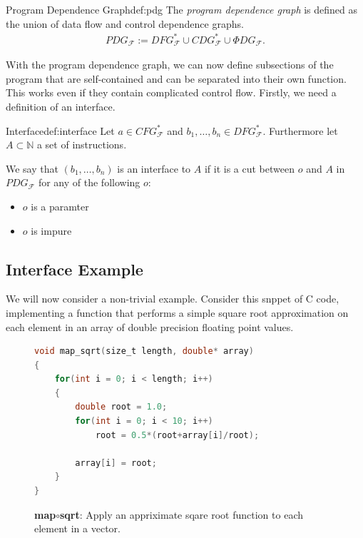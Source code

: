    \begin{definition}{Program Dependence Graph}{def:pdg}
        The {\em program dependence graph} is defined as the union of data flow
        and control dependence graphs.
        \begin{align*}
            PDG_\mathcal{F}:=DFG_\mathcal{F}^*\cup CDG_\mathcal{F}^*\cup\Phi DG_\mathcal{F}\text{.}
        \end{align*}
    \end{definition}

    With the program dependence graph, we can now define subsections of the
    program that are self-contained and can be separated into their own
    function.
    This works even if they contain complicated control flow.
    Firstly, we need a definition of an interface.

    \begin{definition}{Interface}{def:interface}
        Let $a\in CFG_\mathcal{F}^*$ and $b_1,\dots,b_n\in DFG_\mathcal{F}^*$.
        Furthermore let $A\subset\mathbb{N}$ a set of instructions.

        We say that $(b_1,\dots,b_n)$ is an interface to $A$ if it is a cut
        between $o$ and $A$ in $PDG_\mathcal{F}$ for any of the following $o$:
        \begin{itemize}
            \item $o$ is a paramter
            \item $o$ is impure
        \end{itemize}
    \end{definition}


\newpage
\subsection{Interface Example}

    We will now consider a non-trivial example.
    Consider this snppet of C code, implementing a function that performs a
    simple square root approximation on each element in an array of double
    precision floating point values.

\begin{figure}[ht]
\begin{lstlisting}[language=C]
void map_sqrt(size_t length, double* array)
{
    for(int i = 0; i < length; i++)
    {
        double root = 1.0;
        for(int i = 0; i < 10; i++)
            root = 0.5*(root+array[i]/root);

        array[i] = root;
    }
}
\end{lstlisting}
\caption{{\bf map$\circ$sqrt}: Apply an appriximate sqare root function to each
         element in a vector.}
\end{figure}

